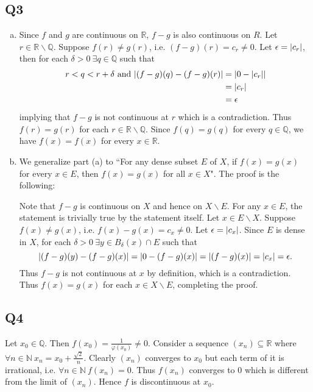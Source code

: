\documentclass[12pt,lettersize]{article}
\newcommand{\R}{\mathbb{R}}
\newcommand{\Q}{\mathbb{Q}}
\newcommand{\N}{\mathbb{N}}
\begin{document}
	\subsection*{Q3}
	\begin{enumerate}[(a)]
		\item Since $f$ and $g$ are continuous on $\R$, $f-g$ is also continuous on $R$. Let $r\in\R\backslash\Q$. Suppose $f(r)\neq g(r)$, i.e. $(f-g)(r)=c_r\neq 0$. Let $\epsilon=\abs{c_r}$, then for each $\delta>0\ \exists q\in\Q$ such that
		\begin{align*}
			r<q<r+\delta\text{ and }\abs{(f-g)(q)-(f-g)(r)} &= \abs{0-\abs{c_r}} \\ &= \abs{c_r}\\ &=\epsilon
		\end{align*}
		implying that $f-g$ is not continuous at $r$ which is a contradiction. Thus $f(r)=g(r)$ for each $r\in\R\backslash\Q$. Since $f(q)=g(q)$ for every $q\in\Q$, we have $f(x)=f(x)$ for every $x\in\R$.
		
		\item We generalize part (a) to ``For any dense subset $E$ of $X$, if $f(x)=g(x)$ for every $x\in E$, then $f(x)=g(x)$ for all $x\in X$". The proof is the following:\smallskip
		
		Note that $f-g$ is continuous on $X$ and hence on $X\backslash E$. For any $x\in E$, the statement is trivially true by the statement itself. Let $x\in E\backslash X$. Suppose $f(x)\neq g(x)$, i.e. $f(x)-g(x)=c_x\neq 0$. Let $\epsilon=\abs{c_x}$. Since $E$ is dense in $X$, for each $\delta>0\ \exists y\in B_\delta(x)\cap E$ such that
		\begin{displaymath}
			\abs{(f-g)(y)-(f-g)(x)}=\abs{0-(f-g)(x)}=\abs{(f-g)(x)}=\abs{c_x}=\epsilon.
		\end{displaymath}
		Thus $f-g$ is not continuous at $x$ by definition, which is a contradiction. Thus $f(x)=g(x)$ for each $x\in X\backslash E$, completing the proof.  
	\end{enumerate}
	\newpage
	
	\subsection*{Q4}
	Let $x_0\in\Q$. Then $f(x_0)=\frac{1}{\varphi(x_0)}\neq 0$. Consider a sequence $(x_n)\subseteq\R$ where $\forall n\in\N\ x_n=x_0+\frac{\sqrt{2}}{n}$. Clearly $(x_n)$ converges to $x_0$ but each term of it is irrational, i.e. $\forall n\in\N\ f(x_n)=0$. Thus $f(x_n)$ converges to $0$ which is different from the limit of $(x_n)$. Hence $f$ is discontinuous at $x_0$.\smallskip
	
\end{document}
